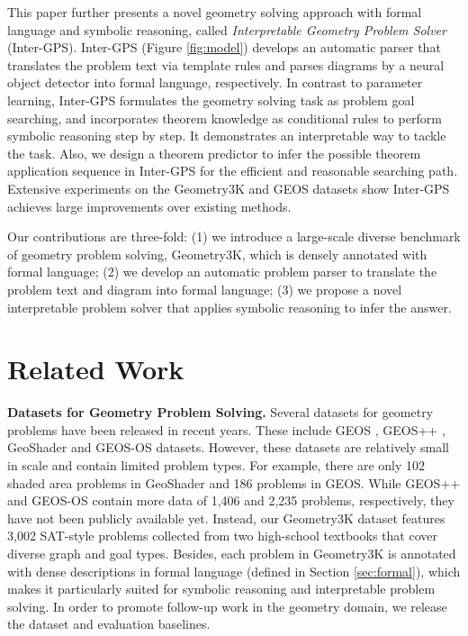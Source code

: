 \documentclass[11pt,a4paper]{article}
\begin{document}
This paper further presents a novel geometry solving approach with formal language and symbolic reasoning, called \textit{Interpretable Geometry Problem Solver} (Inter-GPS). Inter-GPS (Figure \ref{fig:model}) develops an automatic parser that translates the problem text via template rules and parses diagrams by a neural object detector into formal language, respectively. In contrast to parameter learning, Inter-GPS formulates the geometry solving task as problem goal searching, and incorporates theorem knowledge as conditional rules to perform symbolic reasoning step by step. It demonstrates an interpretable way to tackle the task. Also, we design a theorem predictor to infer the possible theorem application sequence in Inter-GPS for the efficient and reasonable searching path. Extensive experiments on the Geometry3K and GEOS datasets show Inter-GPS achieves large improvements over existing methods.

Our contributions are three-fold: (1) we introduce a large-scale diverse benchmark of geometry problem
solving, Geometry3K, which is densely annotated with formal language; (2) we develop an automatic problem parser to translate the problem text and diagram into formal language; (3) we propose a novel interpretable problem solver that applies symbolic reasoning to infer the answer. 


\section{Related Work}
\textbf{Datasets for Geometry Problem Solving.} 
Several datasets for geometry problems have been released in recent years. These include GEOS \cite{seo2015solving}, GEOS++ \cite{sachan2017textbooks}, GeoShader \cite{alvin2017synthesis} and GEOS-OS \cite{sachan2017learning} datasets. However, these datasets are relatively small in scale and contain limited problem types. For example, there are only 102 shaded area problems in GeoShader and 186 problems in GEOS. While GEOS++ and GEOS-OS contain more data of 1,406 and 2,235 problems, respectively, they have not been publicly available yet. Instead, our Geometry3K dataset features 3,002 SAT-style problems collected from two high-school textbooks that cover diverse graph and goal types. Besides, each problem in Geometry3K is annotated with dense descriptions in formal language (defined in Section \ref{sec:formal}), which makes it particularly suited for symbolic reasoning and interpretable problem solving. In order to promote follow-up work in the geometry domain, we release the dataset and evaluation baselines.
\end{document}
